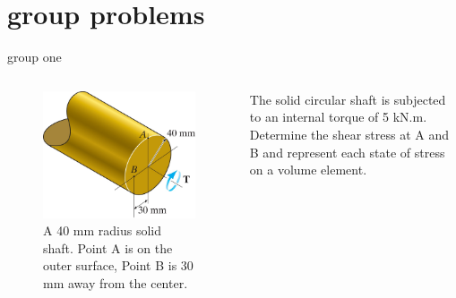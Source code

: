 \documentclass[
  letterpaper,
  ignorenonframetext,
  aspectratio=43,
  handout,
  12pt]{beamer}
\let\Oldincludegraphics\includegraphics
\renewcommand{\includegraphics}[2][]{\Oldincludegraphics[width=\textwidth,height=0.7\textheight,keepaspectratio]{#2}}
\begin{document}
\hypertarget{group-problems}{%
\section{group problems}\label{group-problems}}

\begin{frame}{group one}
\protect\hypertarget{group-one}{}
\begin{columns}[T]
\begin{column}{0.5\textwidth}
\begin{figure}
\centering
\includegraphics{../images/group5-1.jpg}
\caption{A 40 mm radius solid shaft. Point A is on the outer surface,
Point B is 30 mm away from the center.}
\end{figure}
\end{column}

\begin{column}{0.5\textwidth}
The solid circular shaft is subjected to an internal torque of 5 kN.m.
Determine the shear stress at A and B and represent each state of stress
on a volume element.
\end{column}
\end{columns}
\end{frame}
\end{document}
